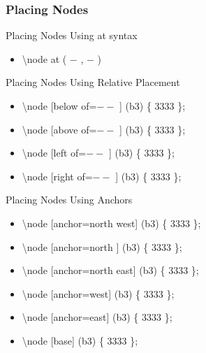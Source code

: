 \documentclass[ aspectratio=169,  12pt,blue,xcolor=pdftex,dvipsnames,table,handout,notes]{beamer}
\begin{document}
		\begin{frame}[t]
		\frametitle{Placing Nodes}

			\begin{block}{Placing Nodes Using at syntax}
			\begin{itemize}
			\item[] 	\textbackslash node at ( $-$ , $-$ )
			\end{itemize}
			\end{block}

			\begin{block}{Placing Nodes Using Relative Placement}
			\begin{itemize}
			\item[] 	\textbackslash node [below of=$--$ ] (b3) \{ 3333 \};
			\item[] 	\textbackslash node [above of=$--$ ] (b3) \{ 3333 \};
			\item[] 	\textbackslash node [left of=$--$ ] (b3) \{ 3333 \};
			\item[] 	\textbackslash node [right of=$--$ ] (b3) \{ 3333 \};
 			\end{itemize}
			\end{block}

			\begin{block}{Placing Nodes Using Anchors}
			\begin{itemize}
			\item[] 	\textbackslash node [anchor=north west] (b3) \{ 3333 \};
			\item[] 	\textbackslash node [anchor=north ] (b3) \{ 3333 \};
			\item[] 	\textbackslash node [anchor=north east] (b3) \{ 3333 \};
			\item[] 	\textbackslash node [anchor=west] (b3) \{ 3333 \};
			\item[] 	\textbackslash node [anchor=east] (b3) \{ 3333 \};
			\item[] 	\textbackslash node [base] (b3) \{ 3333 \};
 			\end{itemize}
			\end{block}

	
		\end{frame}




\end{document}
